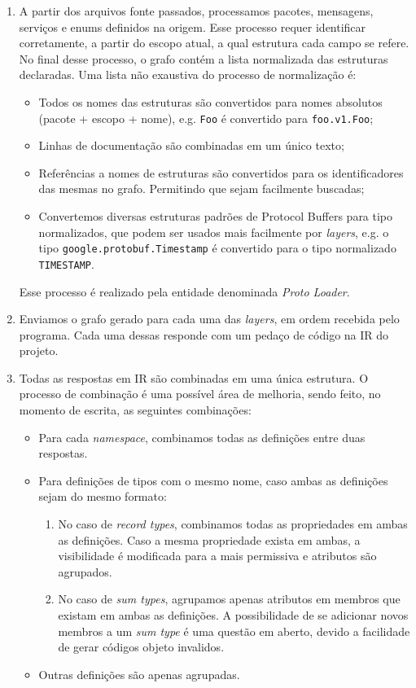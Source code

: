 \begin{enumerate}
\item A partir dos arquivos fonte passados, processamos pacotes, mensagens, serviços e enums
  definidos na origem. Esse processo requer identificar corretamente, a partir do escopo atual,
  a qual estrutura cada campo se refere. No final desse processo, o grafo contém a lista
  normalizada das estruturas declaradas. Uma lista não exaustiva do processo de normalização é:

  \begin{itemize}
  \item Todos os nomes das estruturas são convertidos para nomes absolutos (pacote + escopo + nome),
    e.g. \texttt{Foo} é convertido para \texttt{foo.v1.Foo};
  \item Linhas de documentação são combinadas em um único texto;
  \item Referências a nomes de estruturas são convertidos para os identificadores das mesmas no
    grafo. Permitindo que sejam facilmente buscadas;
  \item Convertemos diversas estruturas padrões de Protocol Buffers para tipo normalizados, que
    podem ser usados mais facilmente por \textit{layers}, e.g. o tipo \texttt{google.protobuf.Timestamp}
    é convertido para o tipo normalizado \texttt{TIMESTAMP}.
  \end{itemize}

  Esse processo é realizado pela entidade denominada \textit{Proto Loader}.
\item Enviamos o grafo gerado para cada uma das \textit{layers}, em ordem recebida pelo programa.
  Cada uma dessas responde com um pedaço de código na IR do projeto.
\item Todas as respostas em IR são combinadas em uma única estrutura. O processo de combinação é
  uma possível área de melhoria, sendo feito, no momento de escrita, as seguintes combinações:

  \begin{itemize}
  \item Para cada \textit{namespace}, combinamos todas as definições entre duas respostas.
  \item Para definições de tipos com o mesmo nome, caso ambas as definições sejam do mesmo formato:
    \begin{enumerate}
    \item No caso de \textit{record types}, combinamos todas as propriedades em ambas as definições.
      Caso a mesma propriedade exista em ambas, a visibilidade é modificada para a mais permissiva e
      atributos são agrupados.
    \item No caso de \textit{sum types}, agrupamos apenas atributos em membros que existam em ambas
      as definições. A possibilidade de se adicionar novos membros a um \textit{sum type} é uma questão
      em aberto, devido a facilidade de gerar códigos objeto invalidos.
    \end{enumerate}
  \item Outras definições são apenas agrupadas.
  \end{itemize}


\end{enumerate}
